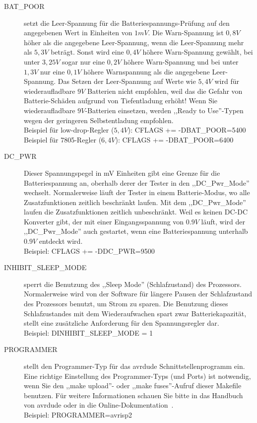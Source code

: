 \begin{description}
  \item[BAT\_POOR] setzt die Leer-Spannung für die Batteriespannungs-Prüfung auf den angegebenen Wert in Einheiten von \(1mV\).
Die Warn-Spannung ist \(0,8V\) höher als die angegebene Leer-Spannung, wenn die Leer-Spannung mehr als \(5,3V\) beträgt.
Sonst wird eine \(0,4V\) höhere Warn-Spannung gewählt, bei unter \(3,25V\) sogar nur eine \(0,2V\) höhere Warn-Spannung und
bei unter \(1,3V\) nur eine \(0,1V\) höhere Warnspannung als die angegebene Leer-Spannung.
Das Setzen der Leer-Spannung auf Werte wie \(5,4V\) wird für wiederaufladbare \(9V\) Batterien nicht empfohlen,
weil das die Gefahr von Batterie-Schäden aufgrund von Tiefentladung erhöht!
Wenn Sie wiederaufladbare \(9V\)-Batterien einsetzen, werden ,,Ready to Use''-Typen wegen der geringeren Selbstentladung empfohlen.\\
Beispiel für low-drop-Regler (\(5,4V\)): CFLAGS += -DBAT\_POOR=5400 \\
Beispiel für 7805-Regler (\(6,4V\)): CFLAGS += -DBAT\_POOR=6400

  \item[DC\_PWR] Dieser Spannungspegel in mV Einheiten gibt eine Grenze für die Batteriespannung an, oberhalb
derer der Tester in den ,,DC\_Pwr\_Mode'' wechselt. Normalerweise läuft der Tester in einem Batterie-Modus,
wo alle Zusatzfunktionen zeitlich beschränkt laufen.
Mit dem ,,DC\_Pwr\_Mode'' laufen die Zusatzfunktionen zeitlich unbeschränkt.
Weil es keinen DC-DC Konverter gibt, der mit einer Eingangsspannung von \(0.9V\) läuft,
wird der ,,DC\_Pwr\_Mode'' auch gestartet, wenn eine Batteriespannung unterhalb \(0.9V\) entdeckt wird.\\
Beispiel: CFLAGS += -DDC\_PWR=9500

  \item[INHIBIT\_SLEEP\_MODE] sperrt die Benutzung des ,,Sleep Mode'' (Schlafzustand) des Prozessors.
Normalerweise wird von der Software für längere Pausen der Schlafzustand des Prozessors benutzt, um Strom zu sparen.
Die Benutzung dieses Schlafzustandes mit dem Wiederaufwachen spart zwar Batteriekapazität, 
stellt eine zusätzliche Anforderung für den Spannungsregler dar.\\
Beispiel: DINHIBIT\_SLEEP\_MODE = 1

  \item[PROGRAMMER] stellt den Programmer-Typ für das avrdude Schnittstellenprogramm ein.
Eine richtige Einstellung des Programmer-Typs (und Ports) ist notwendig, wenn Sie den ,,make upload''- oder
,,make fuses''-Aufruf dieser Makefile benutzen.
Für weitere Informationen schauen Sie bitte in das Handbuch von avrdude oder in die Online-Dokumentation~\cite{avrdude}.\\
Beispiel: PROGRAMMER=avrisp2


\end{description}
